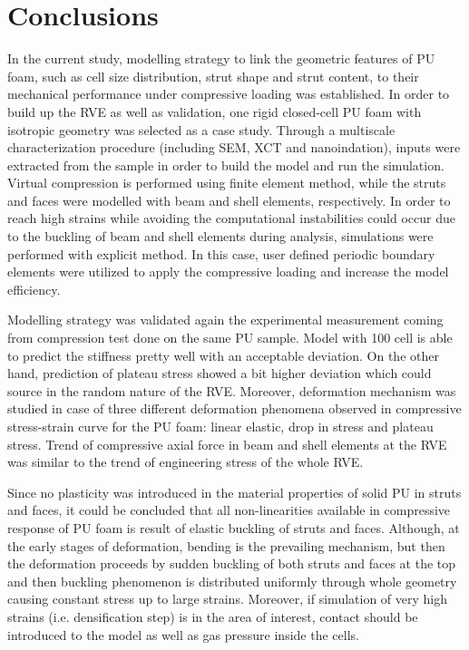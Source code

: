 \documentclass[review]{elsarticle}
\begin{document}
\section{Conclusions}
In the current study, modelling strategy to link the geometric features of PU foam, such as cell size distribution, strut shape and strut content, to their mechanical performance under compressive loading was established. In order to build up the RVE as well as validation, one rigid closed-cell PU foam with isotropic geometry was selected as a case study. Through a multiscale characterization procedure (including SEM, XCT and nanoindation), inputs were extracted from the sample in order to build the model and run the simulation. Virtual compression is performed using finite element method, while the struts and faces were modelled with beam and shell elements, respectively. In order to reach high strains while avoiding the computational instabilities could occur due to the buckling of beam and shell elements during analysis, simulations were performed with explicit method. In this case, user defined periodic boundary elements were utilized to apply the compressive loading and increase the model efficiency.

Modelling strategy was validated again the experimental measurement coming from compression test done on the same PU sample. Model with 100 cell is able to predict the stiffness pretty well with an acceptable deviation. On the other hand, prediction of plateau stress showed a bit higher deviation which could source in the random nature of the RVE. Moreover, deformation mechanism was studied in case of three different deformation phenomena observed in compressive stress-strain curve for the PU foam: linear elastic, drop in stress and plateau stress. Trend of compressive axial force in beam and shell elements at the RVE was similar to the trend of engineering stress of the whole RVE. 

Since no plasticity was introduced in the material properties of solid PU in struts and faces, it could be concluded that all non-linearities available in compressive response of PU foam is result of elastic buckling of struts and faces. Although, at the early stages of deformation, bending is the prevailing mechanism, but then the deformation proceeds by sudden buckling of both struts and faces at the top and then buckling phenomenon is distributed uniformly through whole geometry causing constant stress up to large strains. Moreover, if simulation of very high strains (i.e. densification step) is in the area of interest, contact should be introduced to the model as well as gas pressure inside the cells.    
\end{document}
